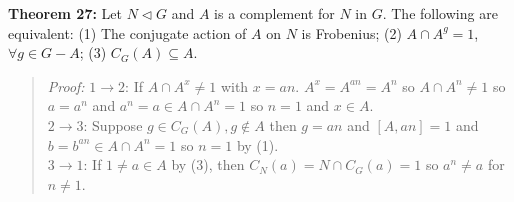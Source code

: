 {\bf Theorem 27:}
Let $N \lhd G$ and $A$ is a complement for $N$ in $G$.  The following are equivalent:
(1) The conjugate action of $A$ on $N$ is Frobenius;
(2) $A \cap A^g = 1$, $\forall g \in G-A$;
(3) $C_G(A) \subseteq A$.
\begin{quote}
\emph{Proof:}  
$1 \rightarrow 2$:
If $A \cap A^x \neq 1$ with $x=an$.  $A^x= A^{an}= A^n$ so $A \cap A^n \neq 1$ so
$a=a^n$ and $a^n=a \in A \cap A^n= 1$ so $n=1$ and $x \in A$.
\\
$2 \rightarrow 3$:  Suppose $g \in C_G(A), g \notin A$ then $g=an$ and $[A, an]=1$ and
$b= b^{an} \in A \cap A^n =1$ so $n=1$ by (1).
\\
$3 \rightarrow 1$:
If $1 \neq a  \in A$ by (3), then $C_N(a)= N \cap C_G(a)=1$ so $a^n \neq a$ for $n \neq 1$.
\end{quote}

